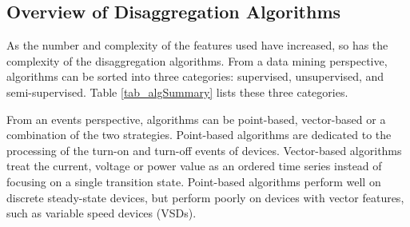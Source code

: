 \subsection{Overview of Disaggregation Algorithms}
As the number and complexity of the features used have increased, 
so has the complexity of the 
disaggregation algorithms.
From a data mining perspective,
algorithms can be sorted into three categories:
supervised, unsupervised, and semi-supervised.
Table \ref{tab_algSummary} lists these three categories.




From an events perspective, 
algorithms can be point-based, vector-based or a combination of the two
strategies.
Point-based algorithms are dedicated to the processing of the turn-on and turn-off
events of devices. 
Vector-based algorithms treat the current, voltage or
power value as an ordered time series instead of
focusing on a single transition state. 
Point-based algorithms perform well on discrete steady-state
devices, but perform poorly on devices with vector features, 
such as variable speed devices (VSDs). 

